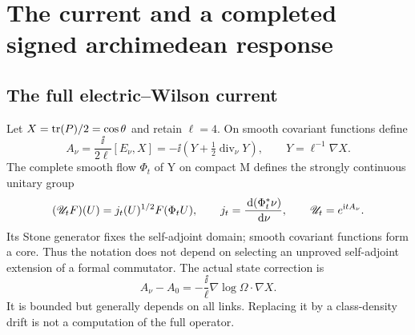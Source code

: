 \section{The current and a completed signed archimedean response}\label{sec:arch}
\subsection{The full electric--Wilson current}
Let $X=\operatorname{tr}(P)/2=\cos\theta$ and retain $\ell=4$. On smooth covariant
functions define
\begin{equation}\label{eq:current}
A_\nu=\frac{\ii}{2\ell}[E_\nu,X]
=-\ii\left(Y+\tfrac12\operatorname{div}_\nu Y\right),
\qquad Y=\ell^{-1}\nabla X .
\end{equation}
The complete smooth flow $\Phi_t$ of Y on compact M defines the
strongly continuous unitary group
\begin{equation}\label{eq:weighted-flow}
(\mathscr U_tF)(U)=j_t(U)^{1/2}F(\Phi_tU),\qquad
j_t=\frac{\,\mathrm d(\Phi_t^*\nu)}{\,\mathrm d\nu},\qquad \mathscr U_t=e^{\mathrm i tA_\nu}.
\end{equation}
Its Stone generator fixes the self-adjoint domain; smooth covariant
functions form a core. Thus the notation does not depend on selecting
an unproved self-adjoint extension of a formal commutator.
The actual state correction is
\begin{equation}
A_\nu-A_0=-\frac{\ii}{\ell}\nabla\log\Omega\cdot\nabla X .
\end{equation}
It is bounded but generally depends on all links. Replacing it by
a class-density drift is not a computation of the full operator.

